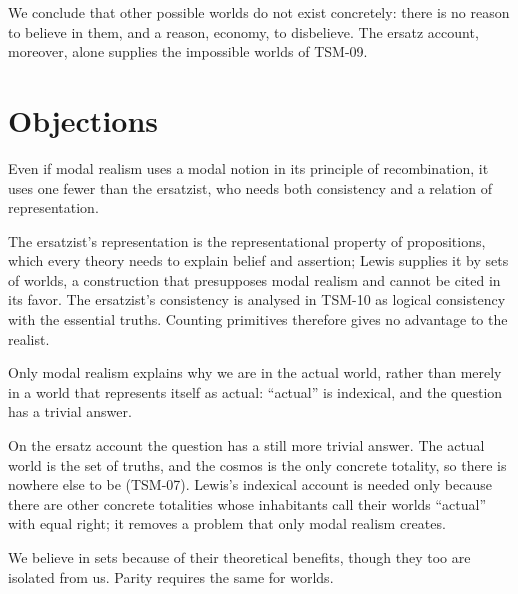 \documentclass{situationist-preprint}
\begin{document}
We conclude that other possible worlds do not exist concretely: there is no reason to believe in them, and a reason, economy, to disbelieve. The ersatz account, moreover, alone supplies the impossible worlds of TSM-09.

\section{Objections}

\begin{objection}
Even if modal realism uses a modal notion in its principle of recombination, it uses one fewer than the ersatzist, who needs both consistency and a relation of representation.
\end{objection}

\begin{reply}
The ersatzist's representation is the representational property of propositions, which every theory needs to explain belief and assertion; Lewis supplies it by sets of worlds, a construction that presupposes modal realism and cannot be cited in its favor. The ersatzist's consistency is analysed in TSM-10 as logical consistency with the essential truths. Counting primitives therefore gives no advantage to the realist.
\end{reply}

\begin{objection}[Actuality]
Only modal realism explains why we are in the actual world, rather than merely in a world that represents itself as actual: \enquote{actual} is indexical, and the question has a trivial answer.
\end{objection}

\begin{reply}
On the ersatz account the question has a still more trivial answer. The actual world is the set of truths, and the cosmos is the only concrete totality, so there is nowhere else to be (TSM-07). Lewis's indexical account is needed only because there are other concrete totalities whose inhabitants call their worlds \enquote{actual} with equal right; it removes a problem that only modal realism creates.
\end{reply}

\begin{objection}
We believe in sets because of their theoretical benefits, though they too are isolated from us. Parity requires the same for worlds.
\end{objection}
\end{document}
